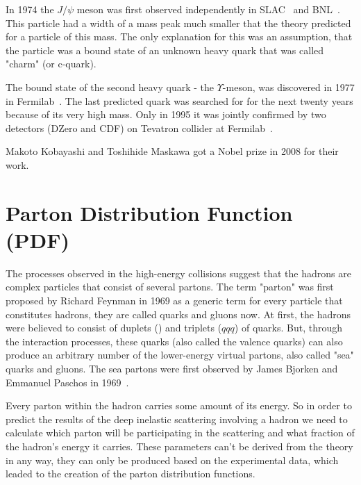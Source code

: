 In 1974 the $J/\psi$ meson was first observed independently in SLAC~\cite{lib:theory_qcd_jpsi2} and BNL~\cite{lib:theory_qcd_jpsi1}. This particle had a width of a mass peak much smaller that the theory predicted for a particle of this mass. The only explanation for this was an assumption, that the particle was a bound state of an unknown heavy quark that was called "charm" (or c-quark).

The bound state of the second heavy quark - the $\Upsilon$-meson, was discovered in 1977 in Fermilab~\cite{lib:theory_qcd_upsilon}. The last predicted quark was searched for for the next twenty years because of its very high mass. Only in 1995 it was jointly confirmed by two detectors (DZero and CDF) on Tevatron collider at Fermilab~\cite{lib:theory_qcd_top}.

Makoto Kobayashi and Toshihide Maskawa got a Nobel prize in 2008 for their work.

\section{Parton Distribution Function (PDF)}
\label{sec:TH_PDF}
The processes observed in the high-energy collisions suggest that the hadrons are complex particles that consist of several partons. The term "parton" was first proposed by Richard Feynman in 1969 as a generic term for every particle that constitutes hadrons, they are called quarks and gluons now. At first, the hadrons were believed to consist of duplets (\qqbar) and triplets ($qqq$) of quarks. But, through the interaction processes, these quarks (also called the valence quarks) can also produce an arbitrary number of the lower-energy virtual partons, also called "sea" quarks and gluons. The sea partons were first observed by James Bjorken and Emmanuel  Paschos in 1969~\cite{lib:theory_proton}.

Every parton within the hadron carries some amount of its energy. So in order to predict the results of the deep inelastic scattering involving a hadron we need to calculate which parton will be participating in the scattering and what fraction of the hadron's energy it carries. These parameters can't be derived from the theory in any way, they can only be produced based on the experimental data, which leaded to the creation of the parton distribution functions.

